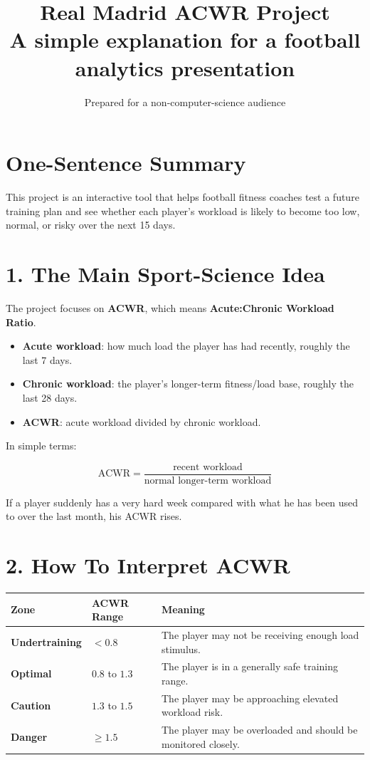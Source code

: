 \documentclass[11pt,a4paper]{article}
\title{\textbf{\textcolor{rmblue}{Real Madrid ACWR Project}}\\
\large A simple explanation for a football analytics presentation}
\author{Prepared for a non-computer-science audience}
\date{}
\begin{document}
\maketitle

\section*{One-Sentence Summary}

This project is an interactive tool that helps football fitness coaches test a future training plan and see whether each player's workload is likely to become too low, normal, or risky over the next 15 days.

\section*{1. The Main Sport-Science Idea}

The project focuses on \textbf{ACWR}, which means \textbf{Acute:Chronic Workload Ratio}.

\begin{itemize}
  \item \textbf{Acute workload}: how much load the player has had recently, roughly the last 7 days.
  \item \textbf{Chronic workload}: the player's longer-term fitness/load base, roughly the last 28 days.
  \item \textbf{ACWR}: acute workload divided by chronic workload.
\end{itemize}

In simple terms:

\[
\text{ACWR} = \frac{\text{recent workload}}{\text{normal longer-term workload}}
\]

If a player suddenly has a very hard week compared with what he has been used to over the last month, his ACWR rises.

\section*{2. How To Interpret ACWR}

\begin{center}
\begin{tabular}{>{\bfseries}p{3.2cm}p{4cm}p{7cm}}
\toprule
Zone & ACWR Range & Meaning \\
\midrule
Undertraining & $< 0.8$ & The player may not be receiving enough load stimulus. \\
Optimal & $0.8$ to $1.3$ & The player is in a generally safe training range. \\
Caution & $1.3$ to $1.5$ & The player may be approaching elevated workload risk. \\
Danger & $\geq 1.5$ & The player may be overloaded and should be monitored closely. \\
\bottomrule
\end{tabular}
\end{center}
\end{document}
